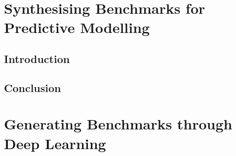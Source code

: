 \ifstapled
\chapter{Synthesising Benchmarks for Predictive Modelling}
\section{Introduction}
\lipsum[1-2]

\section{Conclusion}
\lipsum[1-2]
\else
\chapter{Generating Benchmarks through Deep Learning}
\label{chap:clgen}









\fi